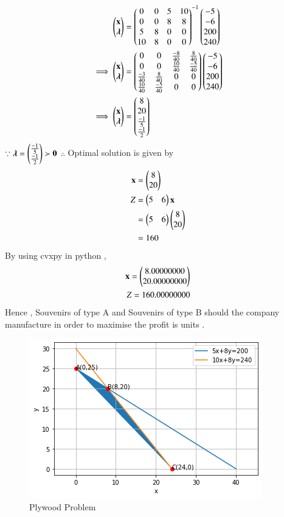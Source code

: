 \documentclass[journal,12pt,twocolumn]{IEEEtran}
\begin{document}
\begin{align}
    \begin{pmatrix}\mathbf{x} \\ \boldsymbol{\lambda}\end{pmatrix} &= \begin{pmatrix}0 & 0 & 5 & 10 \\ 0 & 0 & 8 & 8 \\ 5 & 8 & 0 & 0 \\ 10 & 8 & 0 & 0\end{pmatrix}^{-1}\begin{pmatrix}-5 \\ -6 \\ 200 \\ 240\end{pmatrix}
    \\
    \implies   \begin{pmatrix}\mathbf{x} \\ \boldsymbol{\lambda}\end{pmatrix} &= \begin{pmatrix}0 & 0 & \frac{-8}{40} & \frac{8}{40} \\ 0 & 0 & \frac{10}{40} & \frac{-5}{40} \\ \frac{-3}{40} & \frac{8}{40} & 0 & 0 \\ \frac{10}{40} & \frac{-5}{40} & 0 & 0\end{pmatrix}\begin{pmatrix}-5 \\ -6 \\ 200 \\ 240\end{pmatrix}
    \\
    \implies \begin{pmatrix}\mathbf{x} \\ \boldsymbol{\lambda}\end{pmatrix} &= \begin{pmatrix}8 \\ 20 \\ \frac{-1}{5} \\ \frac{-1}{2} \end{pmatrix}
\end{align}
$\because \boldsymbol{\lambda}=\begin{pmatrix}\frac{-1}{5} \\ \frac{-1}{2}\end{pmatrix} \succ \mathbf{0} $ 
$\therefore$ Optimal solution is given by
\begin{align}
    \mathbf{x} &= \begin{pmatrix}8\\20\end{pmatrix} \\
    Z &= \begin{pmatrix}5 & 6\end{pmatrix}\mathbf{x} \\
    &= \begin{pmatrix}5 & 6\end{pmatrix}\begin{pmatrix}8 \\ 20\end{pmatrix} \\
    &= 160
\end{align}
By using cvxpy in python ,
\begin{align}
    \mathbf{x}=\begin{pmatrix}8.00000000\\20.00000000\end{pmatrix}\\
    Z = 160.00000000
\end{align}
Hence , Souvenirs of type A and  Souvenirs of type B should the company manufacture in order to maximise the profit is  units .
\begin{figure}[H]
\centering
\includegraphics[width=\columnwidth]{Diagram.png}
\caption{Plywood Problem}
\label{fig:Plywood problem}	
\end{figure}
\end{document}
